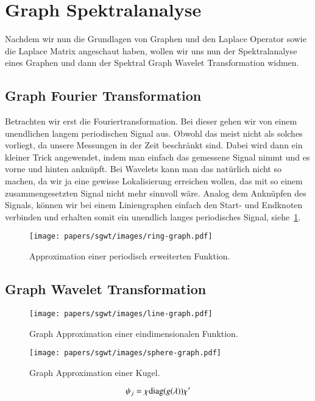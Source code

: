 
\section{Graph Spektralanalyse\label{sec:sgwt:spectralanalysis}}

Nachdem wir nun die Grundlagen von Graphen und den Laplace Operator sowie die 
Laplace Matrix angeschaut haben, wollen wir uns nun der Spektralanalyse eines 
Graphen und dann der Spektral Graph Wavelet Transformation widmen.

\subsection{Graph Fourier Transformation\label{subsec:sgwt:gft}}

Betrachten wir erst die Fouriertransformation. Bei dieser gehen wir von einem 
unendlichen langem periodischen Signal aus. Obwohl das meist nicht als solches 
vorliegt, da unsere Messungen in der Zeit beschr\"ankt sind. Dabei wird dann 
ein kleiner Trick angewendet, indem man einfach das gemessene Signal nimmt und 
es vorne und hinten ankn\"upft. Bei Wavelets kann man das nat\"urlich nicht so 
machen, da wir ja eine gewisse Lokalisierung erreichen wollen, das mit so einem 
zusammengesetzten Signal nicht mehr sinnvoll w\"are. Analog dem Ankn\"upfen des 
Signals, k\"onnen wir bei einem Liniengraphen einfach den Start- und Endknoten 
verbinden und erhalten somit ein unendlich langes periodisches Signal, 
siehe~\cref{fig:sgwt:spectrum:ring}.

\begin{figure}
    \centering
    \texttt{[image: papers/sgwt/images/ring-graph.pdf]}
    \vspace{-10pt}
    \caption{Approximation einer periodisch erweiterten Funktion.
        \label{fig:sgwt:spectrum:ring}}
\end{figure}

\subsection{Graph Wavelet Transformation\label{subsec:sgwt:gwt}}

\begin{figure}
    \centering
    \texttt{[image: papers/sgwt/images/line-graph.pdf]}
    \vspace{-160pt}
    \caption{Graph Approximation einer eindimensionalen Funktion. 
        \label{fig:sgwt:spectrum:line}}
\end{figure}

\begin{figure}
    \centering
    \texttt{[image: papers/sgwt/images/sphere-graph.pdf]}
    \caption{Graph Approximation einer Kugel.
        \label{fig:sgwt:spectrum:sphere}}
\end{figure}

\begin{equation}
\psi_j = \chi \diag{g(\lambda)} \chi'
\end{equation}
